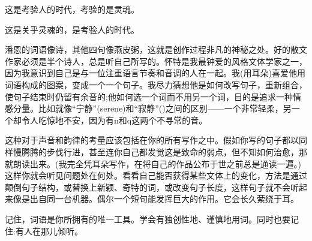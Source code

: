 这是考验人的时代，考验的是灵魂。

这是关乎灵魂的，是考验人的时代。

潘恩的词语像诗，其他四句像燕皮粥，这就是创作过程非凡的神秘之处。好的散文作家必须是半个诗人，总是听自己所写的。怀特是我最钟爱的风格文体学家之一，因为我意识到自己是与一位注重语言节奏和音调的人在一起。我(用耳朵)喜爱他用词语构成的图案，变成一个一个句子。我尽力猜想他是如何改写句子，重新组合，使句子结束时仍留有余音的;他如何选一个词而不用另一个词，目的是追求一种情感分量。比如就像“宁静”(serene)和“寂静”()之间的区别——一个非常轻柔，另一个却令人吃惊地不安，因为有n和q这两个不寻常的音。

这种对于声音和韵律的考量应该包括在你的所有写作之中。假如你写的句子都以同样慢腾腾的步伐行进，甚至连你自己都发觉这是致命的弱点，但不知如何治愈，那就朗读出来。(我完全凭耳朵写作，在将自己的作品公布于世之前总是通读一遍。)这样你就会听见问题处在何处。看看自己能否获得某些文体上的变化，方法是通过颠倒句子结构，或替换上新颖、奇特的词，或改变句子长度，这样句子就不会听起来像是出自同一台机器。偶尔一个短句能发挥巨大的作用。它会长久萦绕于耳。

记住，词语是你所拥有的唯一工具。学会有独创性地、谨慎地用词。同时也要记住:有人在那儿倾听。